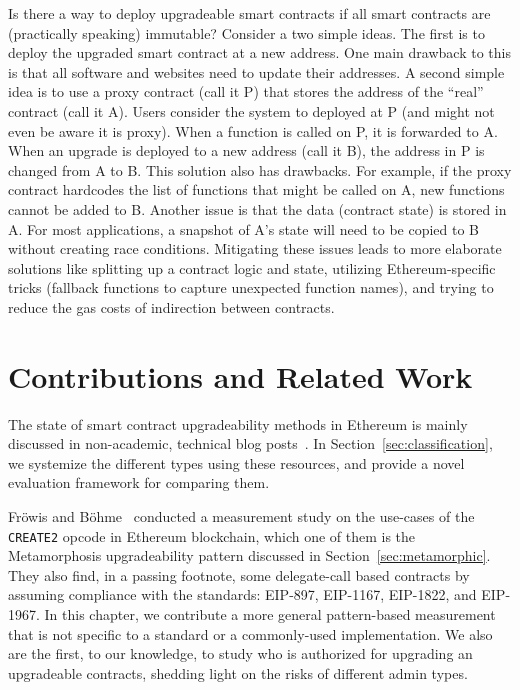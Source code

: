 Is there a way to deploy upgradeable smart contracts if all smart contracts are (practically speaking) immutable? Consider a two simple ideas. The first is to deploy the upgraded smart contract at a new address. One main drawback to this is that all software and websites need to update their addresses. A second simple idea is to use a proxy contract (call it P) that stores the address of the ``real'' contract (call it A). Users consider the system to deployed at P (and might not even be aware it is proxy). When a function is called on P, it is forwarded to A. When an upgrade is deployed to a new address (call it B), the address in P is changed from A to B. This solution also has drawbacks. For example, if the proxy contract hardcodes the list of functions that might be called on A, new functions cannot be added to B. Another issue is that the data (contract state) is stored in A. For most applications, a snapshot of A's state will need to be copied to B without creating race conditions. Mitigating these issues leads to more elaborate solutions like splitting up a contract logic and state, utilizing Ethereum-specific tricks (fallback functions to capture unexpected function names), and trying to reduce the gas costs of indirection between contracts.

\section{Contributions and Related Work} 
The state of smart contract upgradeability methods in Ethereum is mainly discussed in non-academic, technical blog posts~\cite{openzeppelinPost,tobBlogPost}. In Section~\ref{sec:classification}, we systemize the different types using these resources, and provide a novel evaluation framework for comparing them.

Fr{\"o}wis and B{\"o}hme~\cite{frowisnot} conducted a measurement study on the use-cases of the \texttt{CREATE2} opcode in Ethereum blockchain, which one of them is the Metamorphosis upgradeability pattern discussed in Section~\ref{sec:metamorphic}. They also find, in a passing footnote, some delegate-call based contracts by assuming compliance with the standards: EIP-897, EIP-1167, EIP-1822, and EIP-1967. In this chapter, we contribute a more general pattern-based measurement that is not specific to a standard or a commonly-used implementation. We also are the first, to our knowledge, to study who is authorized for upgrading an upgradeable contracts, shedding light on the risks of different admin types.

